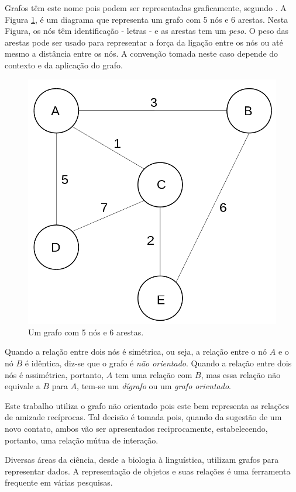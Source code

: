 Grafos têm este nome pois podem ser representadas graficamente, segundo \citep{Bondy08}. A Figura \ref{fig:grafo}, é um diagrama que representa um grafo com 5 nós e 6 arestas. Nesta Figura, os nós têm identificação - letras - e as arestas tem um \emph{peso}. O peso das arestas pode ser usado para representar a força da ligação entre os nós ou até mesmo a distância entre os nós. A convenção tomada neste caso depende do contexto e da aplicação do grafo.

\begin{figure}[!htb]
\centering
\includegraphics[width=12cm]{grafo.png}
\caption{Um grafo com 5 nós e 6 arestas.}
\label{fig:grafo}
\end{figure}

Quando a relação entre dois nós é simétrica, ou seja, a relação entre o nó $A$ e o nó $B$ é idêntica, diz-se que o grafo é \emph{não orientado}. Quando a relação entre dois nós é assimétrica, portanto, $A$ tem uma relação com $B$, mas essa relação não equivale a $B$ para $A$, tem-se um \emph{dígrafo} ou um \emph{grafo orientado}.

Este trabalho utiliza o grafo não orientado pois este bem representa as relações de amizade recíprocas. Tal decisão é tomada pois, quando da sugestão de um novo contato, ambos vão ser apresentados reciprocamente, estabelecendo, portanto, uma relação mútua de interação.

Diversas áreas da ciência, desde a biologia à linguística, utilizam grafos para representar dados. A representação de objetos e suas relações é uma ferramenta frequente em várias pesquisas.

